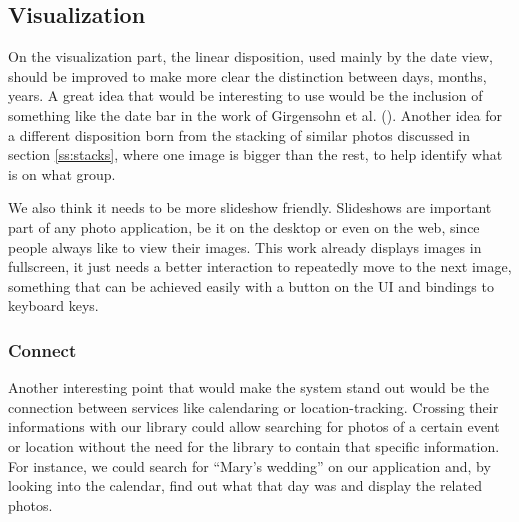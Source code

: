 

\subsection{Visualization} %
\label{sec:visualization}

On the visualization part, the linear disposition, used mainly by the date view, should be improved to make more clear the distinction between days, months, years. A great idea that would be interesting to use would be the inclusion of something like the date bar in the work of Girgensohn et al. \cite{Girgensohn:2010} (). Another idea for a different disposition born from the stacking of similar photos discussed in section \ref{ss:stacks}, where one image is bigger than the rest, to help identify what is on what group.

We also think it needs to be more slideshow friendly. Slideshows are important part of any photo application, be it on the desktop or even on the web, since people always like to view their images. This work already displays images in fullscreen, it just needs a better interaction to repeatedly move to the next image, something that can be achieved easily with a button on the \ac{UI} and bindings to keyboard keys.


\subsubsection{Connect} %
\label{ssub:connect}

Another interesting point that would make the system stand out would be the connection between services like calendaring or location-tracking. Crossing their informations with our library could allow searching for photos of a certain event or location without the need for the library to contain that specific information. For instance, we could search for ``Mary's wedding'' on our application and, by looking into the calendar, find out what that day was and display the related photos.